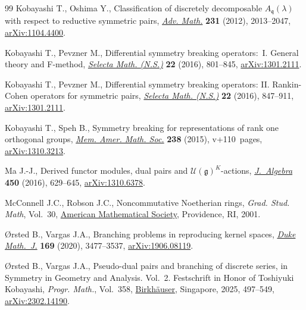 \documentclass[10pt,a4paper]{amsart}
\numberwithin{equation}{section}
\theoremstyle{definition}
\begin{document}
\begin{thebibliography}{99}
Kobayashi T., Oshima Y., Classification of discretely decomposable
 {$A_{\mathfrak{q}}(\lambda)$} with respect to reductive symmetric pairs,
 \href{https://doi.org/10.1016/j.aim.2012.07.006}{\textit{Adv. Math.}}
 \textbf{231} (2012), 2013--2047,
 \href{http://arxiv.org/abs/1104.4400}{arXiv:1104.4400}.

Kobayashi T., Pevzner M., Differential symmetry breaking operators:~{I}.
 {G}eneral theory and {F}-method,
 \href{https://doi.org/10.1007/s00029-015-0207-9}{\textit{Selecta Math.
 (N.S.)}} \textbf{22} (2016), 801--845,
 \href{http://arxiv.org/abs/1301.2111}{arXiv:1301.2111}.

Kobayashi T., Pevzner M., Differential symmetry breaking operators: {II}.
 {R}ankin-{C}ohen operators for symmetric pairs,
 \href{https://doi.org/10.1007/s00029-015-0208-8}{\textit{Selecta Math.
 (N.S.)}} \textbf{22} (2016), 847--911,
 \href{http://arxiv.org/abs/1301.2111}{arXiv:1301.2111}.

Kobayashi T., Speh B., Symmetry breaking for representations of rank one
 orthogonal groups, \href{https://doi.org/10.1090/memo/1126}{\textit{Mem.
 Amer. Math. Soc.}} \textbf{238} (2015), v+110~pages,
 \href{http://arxiv.org/abs/1310.3213}{arXiv:1310.3213}.

Ma J.-J., Derived functor modules, dual pairs and
 {$\mathcal{U}(\mathfrak{g})^K$}-actions,
 \href{https://doi.org/10.1016/j.jalgebra.2015.11.016}{\textit{J.~Algebra}}
 \textbf{450} (2016), 629--645,
 \href{http://arxiv.org/abs/1310.6378}{arXiv:1310.6378}.

McConnell J.C., Robson J.C., Noncommutative {N}oetherian rings, \textit{Grad.
 Stud. Math}, Vol.~30, \href{https://doi.org/10.1090/gsm/030}{American Mathematical Society},
 Providence, RI, 2001.

{\O}rsted B., Vargas J.A., Branching problems in reproducing kernel spaces,
 \href{https://doi.org/10.1215/00127094-2020-0032}{\textit{Duke Math.~J.}}
 \textbf{169} (2020), 3477--3537,
 \href{http://arxiv.org/abs/1906.08119}{arXiv:1906.08119}.

{\O}rsted B., Vargas J.A., Pseudo-dual pairs and branching of discrete series,
 in Symmetry in Geometry and Analysis. {V}ol.~2. {F}estschrift in Honor of
 {T}oshiyuki {K}obayashi, \textit{Progr. Math.}, Vol.~358,
 \href{https://doi.org/10.1007/978-981-97-7662-7_11}{Birkh\"auser}, Singapore,
 2025, 497--549, \href{http://arxiv.org/abs/2302.14190}{arXiv:2302.14190}.


\end{thebibliography}
\end{document}
